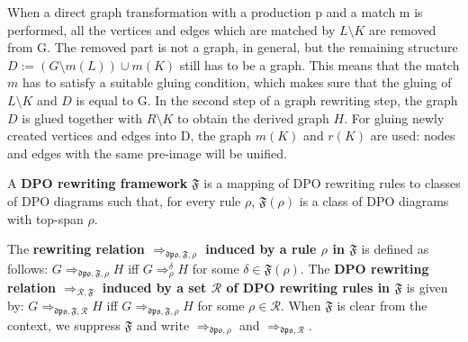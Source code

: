 \documentclass{book}
\begin{document}
          When a direct graph transformation with a production p and a match m is performed, all the vertices and edges which are matched by $L \mathop{\setminus} K$ are removed from G. The removed part is not a graph, in general, but the remaining structure $D := (G \mathop{\setminus} m(L)) \mathop{\cup}  m(K)$ still has to be a graph. This means that the match $m$ has to satisfy a suitable gluing condition, which makes sure that the gluing of $L\mathop{\setminus} K$ and $D$ is equal to G. In the second step of a graph rewriting step, the graph $D$ is glued together with $R \mathop{\setminus} K$ to obtain the derived graph $H$. For gluing newly created vertices and edges into D, the graph $m(K)$ and $r(K)$ are used: nodes and edges with the same pre-image will be unified.

    \begin{definition}
        A \textbf{DPO rewriting framework} $\mathfrak{F}$ is a mapping of DPO rewriting rules to classes of DPO diagrams such that, for every rule $\rho$, $\mathfrak{F}(\rho)$ is a class of DPO diagrams with top-span $\rho$.
      \end{definition}

      
      \begin{definition}
        The \textbf{rewriting relation $\mathop{\Rightarrow}_{\mathfrak{dpo},\mathfrak{F},\rho}$ induced by a rule $\rho$ in $\mathfrak{F}$} is defined as follows: $G \mathop{\Rightarrow}_{\mathfrak{dpo},\mathfrak{F},\rho} H$ iff $G \mathop{\Rightarrow}_\rho^\delta H$ for some $\delta \mathop{\in} \mathfrak{F}(\rho)$. 
          The \textbf{DPO rewriting relation $\mathop{\Rightarrow}_{\mathcal{R},\mathfrak{F}}$ induced by a set $\mathcal{R}$ of DPO rewriting rules in $\mathfrak{F}$} is given by: $G \mathop{\Rightarrow}_{\mathfrak{dpo}, \mathfrak{F},\mathcal{R}} H$ iff $G \mathop{\Rightarrow}_{\mathfrak{dpo},\mathfrak{F}, \rho} H$ for some $\rho \mathop{\in} \mathcal{R}$. When $\mathfrak{F}$ is clear from the context, we 
          suppress $\mathfrak{F}$ and 
          write $\mathop{\Rightarrow}_{\mathfrak{dpo},\rho}$ and $\mathop{\Rightarrow}_{\mathfrak{dpo},\mathcal{R}}$.
      \end{definition} 

\end{document}
